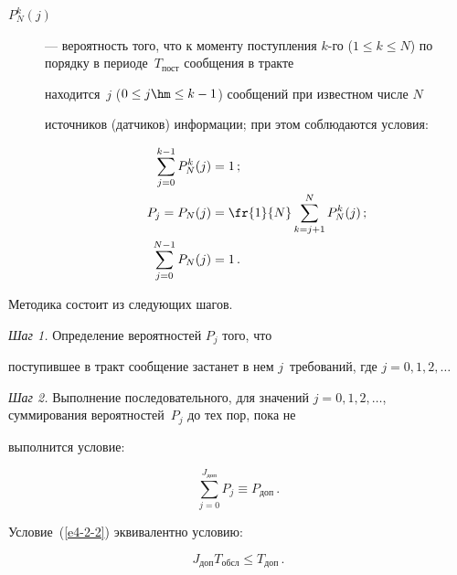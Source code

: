 \begin{description}
\item[$P^k_N(j)$] --- вероятность того, что к моменту поступления $k$-го ($1 \leq 


k \leq N$) по порядку в периоде~$T_{\mathrm{пост}}$ сообщения в тракте 


находится~$j$ ($0 \leq j \hm\leq k-1$) сообщений при известном числе $N$ 


источников (датчиков) информации; при этом соблюдаются условия:


\begin{align}


\sum\limits_{j=0}^{k-1} P_N^k(j) &=1\,;\notag\\


P_j =P_N(j)&=\fr{1}{N}\sum\limits_{k=j+1}^N P_N^k(j)\,;\label{e2-2-2}\\


\sum\limits_{j=0}^{N-1} P_N(j) &=1\,.\notag


\end{align}


\end{description}


        


        Методика состоит из следующих шагов.


        


        \textit{Шаг 1.} Определение вероятностей $P_j$ того, что 


поступившее в тракт сообщение застанет в нем $j$~требований, где $j=0, 1, 


2,\ldots$


        


        \textit{Шаг 2.} Выполнение последовательного, для значений $j=0, 


1, 2,\ldots$, суммирования вероятностей~$P_j$ до тех пор, пока не 


выполнится условие:


        \begin{equation}


        \sum\limits_{j=0}^{J_{\mathrm{доп}}} P_j\equiv P_{\mathrm{доп}}\,.


        \label{e4-2-2}


        \end{equation}


Условие~(\ref{e4-2-2}) эквивалентно условию:


\begin{equation*}


J_{\mathrm{доп}} T_{\mathrm{обсл}}\leq T_{\mathrm{доп}}\,.




\end{equation*}


